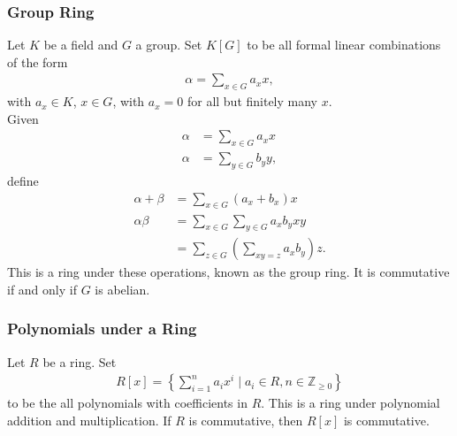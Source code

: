 \documentclass[10pt]{extarticle}
\newcommand{\Z}{\mathbb{Z}}
\begin{document}
  \subsubsection{Group Ring}%
  Let $K$ be a field and $G$ a group. Set $K[G]$ to be all formal linear combinations of the form
  \begin{align*}
    \alpha = \sum_{x\in G} a_x x,
  \end{align*}
  with $a_x\in K$, $x\in G$, with $a_x = 0$ for all but finitely many $x$.\\

  Given
  \begin{align*}
    \alpha &= \sum_{x\in G}a_x x\\
    \alpha &= \sum_{y\in G}b_y y,
  \end{align*}
  define
  \begin{align*}
    \alpha + \beta &= \sum_{x\in G}(a_x + b_x) x\\
    \alpha\beta &= \sum_{x\in G}\sum_{y\in G}a_xb_yxy\\
                &= \sum_{z\in G}\left(\sum_{xy=z}a_xb_y\right)z.
  \end{align*}
  This is a ring under these operations, known as the group ring. It is commutative if and only if $G$ is abelian.
  \subsubsection{Polynomials under a Ring}%
  Let $R$ be a ring. Set
  \begin{align*}
    R[x] = \left\{\sum_{i=1}^{n}a_ix^i\mid a_i\in R,n\in \Z_{\geq 0}\right\}
  \end{align*}
  to be the all polynomials with coefficients in $R$. This is a ring under polynomial addition and multiplication. If $R$ is commutative, then $R[x]$ is commutative.\\
\end{document}

